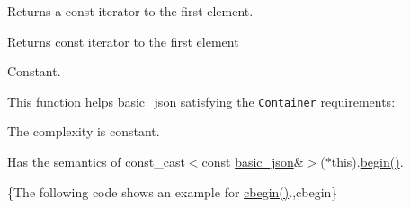 Returns a const iterator to the first element.

 \begin{DoxyReturn}{Returns}
const iterator to the first element
\end{DoxyReturn}
Constant.

This function helps {\ttfamily \hyperlink{classnlohmann_1_1basic__json}{basic\-\_\-json}} satisfying the \href{http://en.cppreference.com/w/cpp/concept/Container}{\tt Container} requirements\-:
\begin{DoxyItemize}
\item The complexity is constant.
\item Has the semantics of {\ttfamily const\-\_\-cast$<$const \hyperlink{classnlohmann_1_1basic__json}{basic\-\_\-json}\&$>$($\ast$this).\hyperlink{classnlohmann_1_1basic__json_ad4e381c54039607be08d7af41a1f6ad1}{begin()}}.
\end{DoxyItemize}

\{The following code shows an example for {\ttfamily \hyperlink{classnlohmann_1_1basic__json_a7355a41b0033ff8a27d58550544d5a59}{cbegin()}}.,cbegin\}

